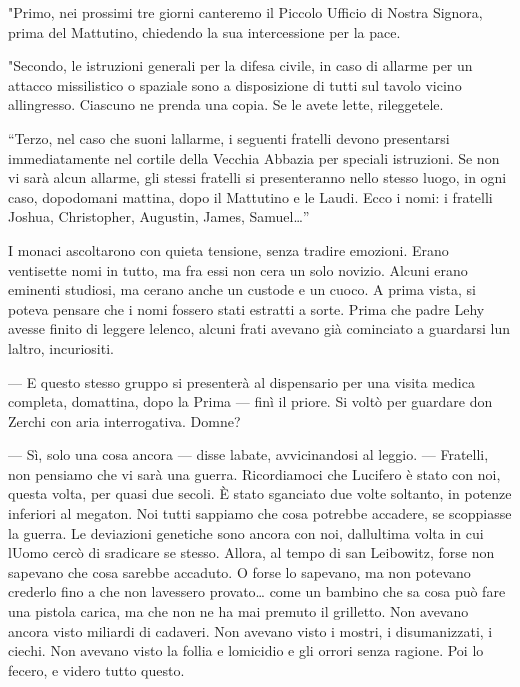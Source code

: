 "Primo, nei prossimi tre giorni canteremo il Piccolo Ufficio di Nostra
Signora, prima del Mattutino, chiedendo la sua intercessione per la
pace.

"Secondo, le istruzioni generali per la difesa civile, in caso di
allarme per un attacco missilistico o spaziale sono a disposizione di
tutti sul tavolo vicino all\textquotesingle ingresso. Ciascuno ne prenda
una copia. Se le avete lette, rileggetele.

``Terzo, nel caso che suoni l\textquotesingle allarme, i seguenti
fratelli devono presentarsi immediatamente nel cortile della Vecchia
Abbazia per speciali istruzioni. Se non vi sarà alcun allarme, gli
stessi fratelli si presenteranno nello stesso luogo, in ogni caso,
dopodomani mattina, dopo il Mattutino e le Laudi. Ecco i nomi: i
fratelli Joshua, Christopher, Augustin, James, Samuel\ldots''

I monaci ascoltarono con quieta tensione, senza tradire emozioni. Erano
ventisette nomi in tutto, ma fra essi non c\textquotesingle era un solo
novizio. Alcuni erano eminenti studiosi, ma c\textquotesingle erano
anche un custode e un cuoco. A prima vista, si poteva pensare che i nomi
fossero stati estratti a sorte. Prima che padre Lehy avesse finito di
leggere l\textquotesingle elenco, alcuni frati avevano già cominciato a
guardarsi l\textquotesingle un l\textquotesingle altro, incuriositi.

--- E questo stesso gruppo si presenterà al dispensario per una visita
medica completa, domattina, dopo la Prima --- finì il priore. Si voltò
per guardare don Zerchi con aria interrogativa. Domne?

--- Sì, solo una cosa ancora --- disse l\textquotesingle abate,
avvicinandosi al leggio. --- Fratelli, non pensiamo che vi sarà una
guerra. Ricordiamoci che Lucifero è stato con noi, questa volta, per
quasi due secoli. È stato sganciato due volte soltanto, in potenze
inferiori al megaton. Noi tutti sappiamo che cosa potrebbe accadere, se
scoppiasse la guerra. Le deviazioni genetiche sono ancora con noi,
dall\textquotesingle ultima volta in cui l\textquotesingle Uomo cercò di
sradicare se stesso. Allora, al tempo di san Leibowitz, forse non
sapevano che cosa sarebbe accaduto. O forse lo sapevano, ma non potevano
crederlo fino a che non l\textquotesingle avessero provato\ldots{} come
un bambino che sa cosa può fare una pistola carica, ma che non ne ha mai
premuto il grilletto. Non avevano ancora visto miliardi di cadaveri. Non
avevano visto i mostri, i disumanizzati, i ciechi. Non avevano visto la
follia e l\textquotesingle omicidio e gli orrori senza ragione. Poi lo
fecero, e videro tutto questo.

